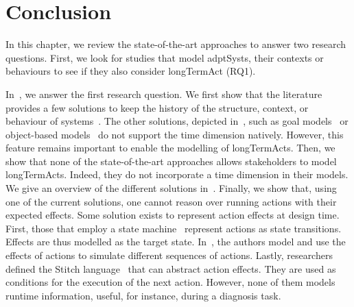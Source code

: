 \section{Conclusion}

In this chapter, we review the state-of-the-art approaches to answer two research questions.
First, we look for studies that model \glspl{adptSyst}, their \glspl{context} or \glspl{behaviour} to see if they also consider \gls{longTermAct} (RQ1).

In~, we answer the first research question.
We first show that the literature provides a few solutions to keep the history of the \gls{structure}, \gls{context}, or \gls{behaviour} of systems~\cite{DBLP:conf/seke/0001FNMKT14, DBLP:conf/models/0001FNMKBT14, 	DBLP:conf/dbpl/MoffittS17, DBLP:conf/icse/TaharaOH17, DBLP:conf/pervasive/HenricksenIR02, DBLP:conf/smartgridsec/0001FKNT14}.
The other solutions, depicted in~,  such as goal models~ \cite{DBLP:conf/icse/CailliauL17, DBLP:conf/icse/IftikharW14a, DBLP:conf/icse/MendoncaAR14, DBLP:conf/icse/ChenPYNZ14, DBLP:conf/re/BaresiPS10} or object-based models~\cite{DBLP:conf/pervasive/HenricksenIR02, DBLP:conf/smartgridsec/0001FKNT14, DBLP:conf/icse/TaharaOH17} do not support the time dimension natively.
However, this feature remains important to enable the modelling of \glspl{longTermAct}.
Then, we show that none of the state-of-the-art approaches allows stakeholders to model \glspl{longTermAct}.
Indeed, they do not incorporate a time dimension in their models.
We give an overview of the different solutions in~.
Finally, we show that, using one of the current solutions, one cannot reason over running actions with their expected effects.
Some solution exists to represent action effects at design time.
First, those that employ a state machine~\cite{DBLP:conf/sigsoft/MorenoCGS15, DBLP:conf/kbse/FilieriGLM11,DBLP:conf/wetice/DjoudiBZ14, DBLP:conf/aosd/ZhangGC09, DBLP:conf/icse/GhezziPST13, DBLP:conf/kbse/TajalliGEM10} represent actions as state transitions.
Effects are thus modelled as the target state.
In~\cite{DBLP:conf/smartgridsec/0001FKNT14}, the authors model and use the effects of actions to simulate different sequences of actions.
Lastly, researchers defined the Stitch language~\cite{DBLP:journals/jss/ChengG12} that can abstract action effects.
They are used as conditions for the execution of the next action.
However, none of them models runtime information, useful, for instance, during a diagnosis task.

